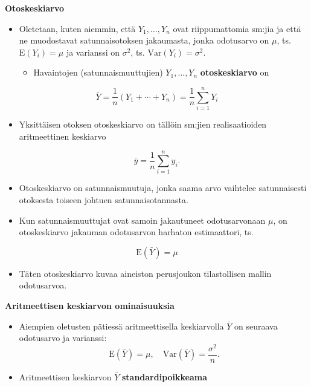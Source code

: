 \documentclass[
]{book}
\providecommand{\tightlist}{%
  \setlength{\itemsep}{0pt}\setlength{\parskip}{0pt}}
\begin{document}
\textbf{Otoskeskiarvo}

\begin{itemize}
\tightlist
\item
  Oletetaan, kuten aiemmin, että \(Y_1,\ldots,Y_n\) ovat riippumattomia sm:jia ja että ne muodostavat satunnaisotoksen jakaumasta, jonka odotusarvo on \(\mu\), ts. \(\text{E}(Y_i) = \mu\) ja varianssi on \(\sigma^2\), ts. \(\text{Var}(Y_i) = \sigma^2\).

  \begin{itemize}
  \tightlist
  \item
    Havaintojen (satunnaismuuttujien) \(Y_1, \ldots, Y_n\) \textbf{otoskeskiarvo} on
  \end{itemize}
\end{itemize}

\[
\bar{Y} = \frac{1}{n}(Y_1 + \cdots + Y_n) = \frac{1}{n} \sum_{i=1}^{n} Y_i
\]

\begin{itemize}
\tightlist
\item
  Yksittäisen otoksen otoskeskiarvo on tällöin sm:jien realisaatioiden aritmeettinen keskiarvo
\end{itemize}

\[
\bar{y} = \frac{1}{n} \sum_{i=1}^{n} y_i.
\]

\begin{itemize}
\tightlist
\item
  Otoskeskiarvo on satunnaismuutuja, jonka saama arvo vaihtelee satunnaisesti otoksesta toiseen johtuen satunnaisotannasta.
\item
  Kun satunnaismuuttujat ovat samoin jakautuneet odotusarvonaan \(\mu\), on otoskeskiarvo jakauman odotusarvon harhaton estimaattori, ts.
\end{itemize}

\[\text{E}(\bar{Y}) = \mu\]

\begin{itemize}
\tightlist
\item
  Täten otoskeskiarvo kuvaa aineiston perusjoukon tilastollisen mallin odotusarvoa.
\end{itemize}

\textbf{Aritmeettisen keskiarvon ominaisuuksia}

\begin{itemize}
\item
  Aiempien oletusten pätiessä aritmeettisella keskiarvolla \(\bar{Y}\) on seuraava odotusarvo ja varianssi:
  \[
  \text{E}(\bar{Y}) = \mu,  \quad
  \mathrm{Var}(\bar{Y}) = \frac{\sigma^2}{n}.
  \]
\item
  Aritmeettisen keskiarvon \(\bar{Y}\) \textbf{standardipoikkeama}
\end{itemize}
\end{document}

